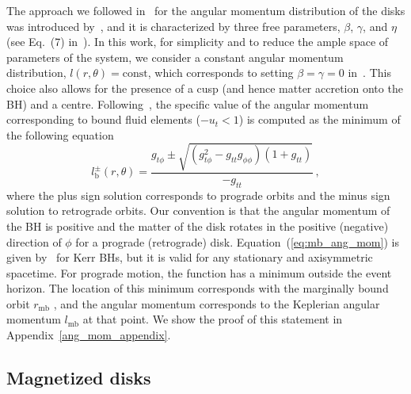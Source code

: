 \documentclass[twocolumn,aps,showpacs,showkeys,prd,superscriptaddress,byrevtex, amsmath]{revtex4-1}
\begin{document}
The approach we followed in~\cite{Gimeno-Soler:2017} for the angular momentum distribution of the disks was introduced by~\cite{Qian:2009}, and it is characterized by three free parameters, $\beta$, $\gamma$, and $\eta$ (see Eq.~(7) in~\cite{Gimeno-Soler:2017}). In this work, for simplicity and to reduce the ample space of parameters of the system, we consider a constant angular momentum distribution, $l(r,\theta) = \mathrm{const}$, which corresponds to setting $\beta=\gamma=0$ in~\cite{Gimeno-Soler:2017}. This choice also allows for the presence of a cusp (and hence matter accretion onto the BH) and a centre. Following~\citep{Daigne:2004}, the specific value of the angular momentum corresponding to bound fluid elements ($-u_t<1$) is computed as the minimum of the following equation
\begin{equation}\label{eq:mb_ang_mom}
l^{\pm}_{\mathrm{b}}(r, \theta) = \frac{g_{t\phi} \pm \sqrt{ (g_{t\phi}^2-g_{tt}g_{\phi\phi})  (1+g_{tt}) } }{-g_{tt}}\,,
\end{equation}
where the plus sign solution corresponds to prograde orbits and the minus sign solution to retrograde orbits. Our convention is that the angular momentum of the BH is positive and the matter of the disk rotates in the positive (negative) direction of $\phi$ for a prograde (retrograde) disk. Equation~(\ref{eq:mb_ang_mom}) is given by~\citep{Daigne:2004} for Kerr BHs, but it is valid for any stationary and axisymmetric spacetime. For prograde motion, the function has a minimum outside the event horizon. The location of this minimum corresponds with the marginally bound orbit $r_{\mathrm{mb}}$ , and the angular momentum corresponds to the Keplerian angular momentum $l_{\mathrm{mb}}$ at that point. We show the proof of this statement in Appendix~\ref{ang_mom_appendix}.

\subsection{Magnetized disks}
\end{document}
